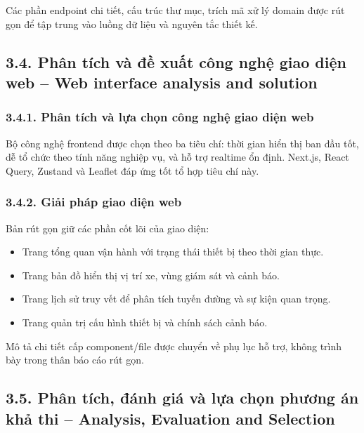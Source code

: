 \documentclass[a4paper]{extarticle}
\providecommand{\tightlist}{%
  \setlength{\itemsep}{0pt}\setlength{\parskip}{0pt}}
\begin{document}
Các phần endpoint chi tiết, cấu trúc thư mục, trích mã xử lý domain được rút gọn để tập trung vào luồng dữ liệu và nguyên tắc thiết kế.

\subsection{3.4. Phân tích và đề xuất công nghệ giao diện web -- Web interface analysis and solution}

\subsubsection{3.4.1. Phân tích và lựa chọn công nghệ giao diện web}

Bộ công nghệ frontend được chọn theo ba tiêu chí: thời gian hiển thị ban đầu tốt, dễ tổ chức theo tính năng nghiệp vụ, và hỗ trợ realtime ổn định. Next.js, React Query, Zustand và Leaflet đáp ứng tốt tổ hợp tiêu chí này.

\subsubsection{3.4.2. Giải pháp giao diện web}

Bản rút gọn giữ các phần cốt lõi của giao diện:

\begin{itemize}
\tightlist
\item
  Trang tổng quan vận hành với trạng thái thiết bị theo thời gian thực.
\item
  Trang bản đồ hiển thị vị trí xe, vùng giám sát và cảnh báo.
\item
  Trang lịch sử truy vết để phân tích tuyến đường và sự kiện quan trọng.
\item
  Trang quản trị cấu hình thiết bị và chính sách cảnh báo.
\end{itemize}

Mô tả chi tiết cấp component/file được chuyển về phụ lục hỗ trợ, không trình bày trong thân báo cáo rút gọn.

\subsection{3.5. Phân tích, đánh giá và lựa chọn phương án khả thi -- Analysis, Evaluation and Selection}
\end{document}
